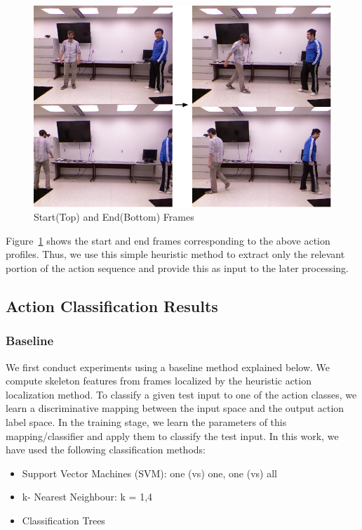 \documentclass[10pt,twocolumn,letterpaper]{article}
\begin{document}
\begin{figure}[ht]

\includegraphics[scale=0.3]{first_last.png}
\caption{Start(Top) and End(Bottom) Frames}
\label{Fig:top_bot}
\end{figure}

Figure~\ref{Fig:top_bot} shows the start and end frames corresponding to the above action profiles. Thus, we use this simple heuristic method to extract only the relevant portion of the action sequence and provide this as input to  the later processing.


\subsection{Action Classification Results}

\subsubsection{Baseline}
We first conduct experiments using a baseline method explained below. We compute skeleton features from frames localized by the heuristic action localization method. To classify a given test input to one of the action classes, we learn a discriminative mapping between the input space and the output action label space. In the training stage, we learn the parameters of this mapping/classifier and apply them to classify the test input. In this work, we have used the following classification methods:
\begin{itemize}
\item Support Vector Machines (SVM): one (vs) one, one (vs) all 
\item k- Nearest Neighbour: k = 1,4
\item Classification Trees
\end{itemize}
\end{document}
